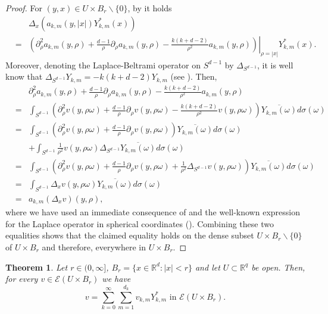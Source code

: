 \documentclass[a4paper,10pt]{amsart}
\newtheorem{theorem}{Theorem}
\newtheorem*{crucial lemma}{Lemma \ref{lem:nice polynomial2}}
\theoremstyle{definition}
\newcommand{\R}{\mathbb{R}}
\begin{document}
\begin{proof}
	For $(y,x)\in U\times B_r\backslash\{0\}$, by \cite[Lemma 2.63 - note that there is typo]{Folland1995} it holds
	\begin{eqnarray*}
		&&\Delta_x\left(a_{k,m}(y,|x|)Y^*_{k,m}(x)\right)\\
		&=&\left.\left(\partial_\rho^2 a_{k,m}(y,\rho)+\frac{d-1}{\rho}\partial_\rho a_{k,m}(y,\rho)-\frac{k(k+d-2)}{\rho^2}a_{k,m}(y,\rho)\right)\right|_{\rho=|x|}Y_{k,m}^*(x).
	\end{eqnarray*}
	Moreover, denoting the Laplace-Beltrami operator on $S^{d-1}$ by $\Delta_{S^{d-1}}$, it is well know that $\Delta_{S^{d-1}}Y_{k,m}=-k(k+d-2)Y_{k,m}$ (see \cite[Equation (\S15.2)]{Mueller1998}). Then,
	\begin{eqnarray*}
		&&\partial_\rho^2 a_{k,m}(y,\rho)+\frac{d-1}{\rho}\partial_\rho a_{k,m}(y,\rho)-\frac{k(k+d-2)}{\rho^2}a_{k,m}(y,\rho)\\
		&=&\int_{S^{d-1}} \left(\partial_\rho^2 v(y,\rho\omega)+\frac{d-1}{\rho}\partial_\rho v(y,\rho\omega)-\frac{k(k+d-2)}{\rho^2}v(y,\rho\omega)\right)\overline{Y_{k,m}(\omega)}d\sigma(\omega)\\
		&=&\int_{S^{d-1}} \left(\partial_\rho^2 v(y,\rho\omega)+\frac{d-1}{\rho}\partial_\rho v(y,\rho\omega)\right)\overline{Y_{k,m}(\omega)}d\sigma(\omega)\\
		&&+\int_{S^{d-1}} \frac{1}{\rho^2}v(y,\rho\omega)\Delta_{S^{d-1}}\overline{Y_{k,m}(\omega)}d\sigma(\omega)\\
		&=&\int_{S^{d-1}} \left(\partial_\rho^2 v(y,\rho\omega)+\frac{d-1}{\rho}\partial_\rho v(y,\rho\omega)+\frac{1}{\rho^2}\Delta_{S^{d-1}}v(y,\rho\omega)\right)\overline{Y_{k,m}(\omega)}d\sigma(\omega)\\
		&=&\int_{S^{d-1}}\Delta_x v(y,\rho\omega)\overline{Y_{k,m}(\omega)}d\sigma(\omega)\\
		&=&a_{k,m}(\Delta_x v)(y,\rho),
	\end{eqnarray*}
	where we have used an immediate consequence of \cite[\S 14, Lemma 1]{Mueller1998} and the well-known expression for the Laplace operator in spherical coordinates (\cite[Equation (\S 14.17)]{Mueller1998}). Combining these two equalities shows that the claimed equality holds on the dense subset  $U\times B_r\backslash\{0\}$ of $U\times B_r$ and therefore, everywhere in $U\times B_r$.
\end{proof}

\begin{theorem}\label{theo:spherical harmonics expansion for smooth functions}
	Let $r\in (0,\infty]$, $B_r=\{x\in\R^d\colon |x|<r\}$ and let $U\subset \R^q$ be open. Then, for every $v\in\mathscr{E}(U\times B_r)$ we have
	\[v=\sum_{k=0}^\infty\sum_{m=1}^{d_k} v_{k,m} Y_{k,m}^*\text{ in }\mathscr{E}(U\times B_r).\]
\end{theorem}
\end{document}

